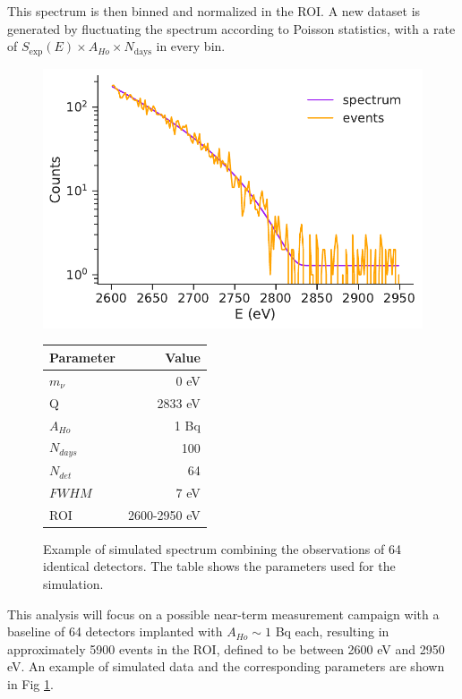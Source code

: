 This spectrum is then binned and normalized in the ROI. A new dataset is generated by fluctuating the spectrum according to Poisson statistics, with a rate of $S_{\text{exp}}(E)\times A_{Ho}\times N_{\text{days}}$ in every bin. 
\begin{figure}
  \begin{minipage}{0.55\linewidth}
    \includegraphics[width=\linewidth]{figures/ch3/endpoint/generated_0.pdf}
  \end{minipage}
  \hfill
  \centering
  \begin{minipage}{0.4\linewidth}
    \begin{tabular}{l r} \hline 
      \toprule
         Parameter & Value\\
         \midrule
         $m_\nu$& 0 eV\\
         Q& 2833 eV\\
         $A_{Ho}$& 1 Bq\\ 
         $N_{days}$& 100\\
         $N_{det}$& 64\\
         $FWHM$& 7 eV\\
         ROI& 2600-2950 eV\\ 
         \bottomrule
    \end{tabular}
  \end{minipage}
\caption{Example of simulated spectrum combining the observations of 64 identical detectors. The table shows the
parameters used for the simulation.}
\label{fig:simdata}
\end{figure}

This analysis will focus on a possible near-term measurement campaign with a baseline of 64 detectors implanted with $A_{Ho}\sim1$ Bq each, resulting in approximately 5900 events in the ROI, defined to be between 2600 eV and 2950 eV. An example of simulated data and the corresponding parameters are shown in Fig \ref{fig:simdata}.


